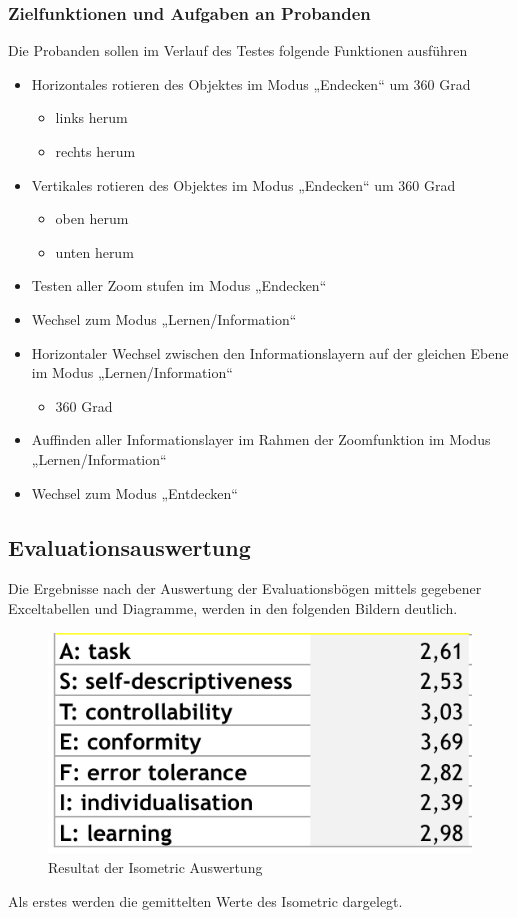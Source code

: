 \documentclass[runningheads,a4paper, 12pt]{llncs}
\begin{document}
\subsubsection{Zielfunktionen und Aufgaben an Probanden}
Die Probanden sollen im Verlauf des Testes folgende Funktionen ausführen
	\begin{itemize}
	\item Horizontales rotieren des Objektes im Modus „Endecken“ um 360 Grad
	\begin{itemize}
		\item links herum
		\item rechts herum
	\end{itemize}
	\item Vertikales rotieren des Objektes im Modus „Endecken“ um 360 Grad
	\begin{itemize}
		\item oben herum
		\item unten herum
	\end{itemize}
	\item Testen aller Zoom stufen im Modus „Endecken“
	\item Wechsel zum Modus „Lernen/Information“
	\item Horizontaler Wechsel zwischen den Informationslayern auf der gleichen Ebene im Modus „Lernen/Information“
	\begin{itemize}
		\item 360 Grad
	\end{itemize}
	\item Auffinden aller Informationslayer im Rahmen der Zoomfunktion im Modus „Lernen/Information“
	\item Wechsel zum Modus „Entdecken“
\end{itemize}
\subsection{Evaluationsauswertung}
Die Ergebnisse nach der Auswertung der Evaluationsbögen mittels gegebener Exceltabellen und Diagramme, werden in den folgenden Bildern deutlich.

\begin{figure}[H]
	\centering
	\includegraphics[angle=0,scale=1]{iso_metric_result}
	\caption{Resultat der Isometric Auswertung}
	\label{fig:result1}
\end{figure}
Als erstes werden die gemittelten Werte des Isometric dargelegt.
\end{document}
